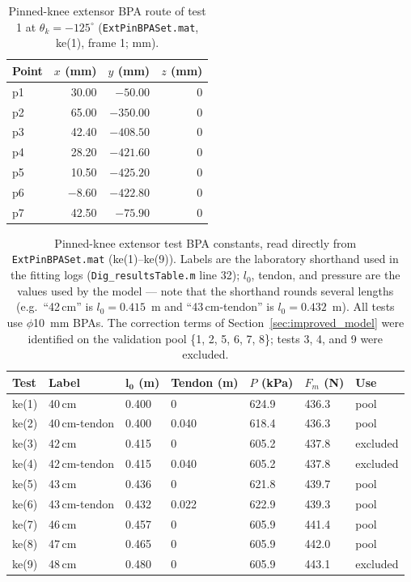 \begin{table}[htbp]
\caption{Pinned-knee extensor BPA route of test 1 at $\theta_{k}=-125^{\circ}$ (\texttt{ExtPinBPASet.mat}, ke(1), frame 1; mm).}
\label{tab:app_extpin_route}
\begin{tabular}{@{}lrrr@{}}
\toprule
\textbf{Point} & $x$ (mm) & $y$ (mm) & $z$ (mm) \\
\midrule
p1 & 30.00  & $-50.00$ & 0 \\
p2 & 65.00  & $-350.00$ & 0 \\
p3 & 42.40  & $-408.50$ & 0 \\
p4 & 28.20  & $-421.60$ & 0 \\
p5 & 10.50  & $-425.20$ & 0 \\
p6 & $-8.60$ & $-422.80$ & 0 \\
p7 & 42.50  & $-75.90$ & 0 \\
\bottomrule
\end{tabular}
\end{table}

\begin{table}[htbp]
\caption{Pinned-knee extensor test BPA constants, read directly from \texttt{ExtPinBPASet.mat} (ke(1)--ke(9)). Labels are the laboratory shorthand used in the fitting logs (\texttt{Dig\_resultsTable.m} line 32); $l_{0}$, tendon, and pressure are the values used by the model --- note that the shorthand rounds several lengths (e.g.\ ``42\,cm'' is $l_{0}=0.415$~m and ``43\,cm-tendon'' is $l_{0}=0.432$~m). All tests use $\phi$\qty{10}{\mm} BPAs. The correction terms of Section~\ref{sec:improved_model} were identified on the validation pool \{1, 2, 5, 6, 7, 8\}; tests 3, 4, and 9 were excluded.}
\label{tab:app_extpin_tests}
\begin{tabular}{@{}lllllll@{}}
\toprule
\textbf{Test} & \textbf{Label} & $\boldsymbol{l_{0}}$ (m) & Tendon (m) & $P$ (kPa) & $F_{m}$ (N) & \textbf{Use} \\
\midrule
ke(1) & 40\,cm          & 0.400 & 0     & 624.9 & 436.3 & pool \\
ke(2) & 40\,cm-tendon   & 0.400 & 0.040 & 618.4 & 436.3 & pool \\
ke(3) & 42\,cm          & 0.415 & 0     & 605.2 & 437.8 & excluded \\
ke(4) & 42\,cm-tendon   & 0.415 & 0.040 & 605.2 & 437.8 & excluded \\
ke(5) & 43\,cm          & 0.436 & 0     & 621.8 & 439.7 & pool \\
ke(6) & 43\,cm-tendon   & 0.432 & 0.022 & 622.9 & 439.3 & pool \\
ke(7) & 46\,cm          & 0.457 & 0     & 605.9 & 441.4 & pool \\
ke(8) & 47\,cm          & 0.465 & 0     & 605.9 & 442.0 & pool \\
ke(9) & 48\,cm          & 0.480 & 0     & 605.9 & 443.1 & excluded \\
\bottomrule
\end{tabular}
\end{table}

